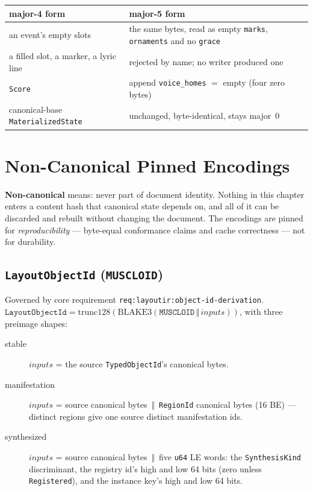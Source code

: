 \documentclass[11pt,letterpaper]{report}
\newcounter{requirement}[chapter]
\newcommand{\cat}{\ensuremath{\,\Vert\,}}
\begin{document}
\begin{center}
\begin{tabular}{p{1.9in} p{3.4in}}
  \toprule
  \textbf{major-4 form} & \textbf{major-5 form} \\
  \midrule
  an event's empty slots & the same bytes, read as empty \texttt{marks},
    \texttt{ornaments} and no \texttt{grace} \\
  a filled slot, a marker, a lyric line & rejected by name; no writer
    produced one \\
  \texttt{Score} & append \texttt{voice\_homes} $=$ empty (four zero
    bytes) \\
  canonical-base \texttt{MaterializedState} & unchanged, byte-identical,
    stays major~0 \\
  \bottomrule
\end{tabular}
\end{center}

\chapter{Non-Canonical Pinned Encodings}
\label{ch:noncanon}

\textbf{Non-canonical} means: never part of document identity. Nothing in
this chapter enters a content hash that canonical state depends on, and all
of it can be discarded and rebuilt without changing the document. The
encodings are pinned for \emph{reproducibility} --- byte-equal conformance
claims and cache correctness --- not for durability.

\section{\texttt{LayoutObjectId} (\texttt{MUSCLOID})}
\label{sec:noncanon:muscloid}

Governed by core requirement \texttt{req:layoutir:object-id-derivation}.
$\texttt{LayoutObjectId} = \mathrm{trunc128}(\mathrm{BLAKE3}(
\texttt{MUSCLOID} \cat \mathit{inputs}))$, with three preimage shapes:

\begin{description}
  \item[stable] $\mathit{inputs}$ = the source
    \texttt{TypedObjectId}'s canonical bytes.
  \item[manifestation] $\mathit{inputs}$ = source canonical bytes \cat{}
    \texttt{RegionId} canonical bytes (16 BE) --- distinct regions give one
    source distinct manifestation ids.
  \item[synthesized] $\mathit{inputs}$ = source canonical bytes \cat{}
    five \texttt{u64} LE words: the \texttt{SynthesisKind} discriminant,
    the registry id's high and low 64 bits (zero unless
    \texttt{Registered}), and the instance key's high and low 64 bits.
\end{description}
\end{document}
